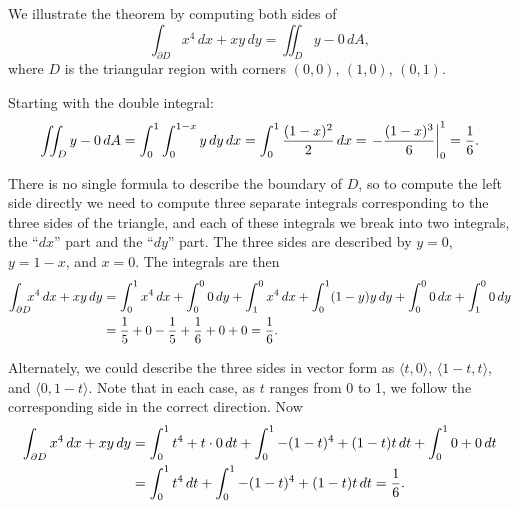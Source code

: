 \begin{example}{}{}
We illustrate the theorem by computing both sides of
$$\int_{\partial D} x^4\,dx + xy\,dy=\iint_D y-0\,dA,$$
where $D$ is the triangular region with corners $(0,0)$, $(1,0)$,
$(0,1)$.
\end{example}
\begin{solution}
Starting with the double integral:
$$\iint_D y-0\,dA=\int_0^1\int_0^{1-x} y\,dy\,dx=
\int_0^1
{(1-x)^2\over2}\,dx=\left.-{(1-x)^3\over6}\right|_0^1={1\over6}.$$

There is no single formula to describe the boundary of $D$, so to
compute the left side directly we need to compute three separate
integrals corresponding to the three sides of the triangle, and each
of these integrals we break into two integrals, the ``$dx$'' part and
the ``$dy$'' part.
The three sides are described by $y=0$, $y=1-x$, and $x=0$. The
integrals are then
\begin{align*}
\int_{\partial D}\!\!\! x^4\,dx + xy\,dy&=
\int_0^1 x^4\,dx+\int_0^0 0\,dy+\int_1^0 x^4\,dx+\int_0^1 (1-y)y\,dy+
\int_0^0 0\,dx+\int_1^0 0\,dy	\\
&={1\over5}+0-{1\over5}+{1\over6}+0+0={1\over6}.
\end{align*}

Alternately, we could describe the three sides in vector form as
$\langle t,0\rangle$, $\langle 1-t,t\rangle$, and $\langle
0,1-t\rangle$. Note that in each case, as $t$ ranges from 0 to 1, we
follow the corresponding side in the correct direction. Now
\begin{align*}
\int_{\partial D} x^4\,dx + xy\,dy&=
\int_0^1 t^4 + t\cdot 0\,dt + \int_0^1 -(1-t)^4 + (1-t)t\,dt
+\int_0^1 0 + 0\,dt	\\
&=\int_0^1 t^4\,dt + \int_0^1 -(1-t)^4 + (1-t)t\,dt
={1\over6}.
\end{align*}
%
\end{solution}

